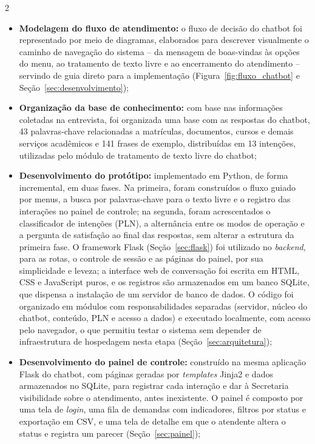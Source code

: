 \documentclass[10pt]{article}
\begin{document}
\begin{multicols}{2}
\begin{itemize}
  \item \textbf{Modelagem do fluxo de atendimento:} o fluxo de decisão do
  chatbot foi representado por meio de diagramas, elaborados para
  descrever visualmente o caminho de navegação do sistema -- da mensagem
  de boas-vindas às opções do menu, ao tratamento de texto livre e ao
  encerramento do atendimento -- servindo de guia direto para a implementação (Figura~\ref{fig:fluxo_chatbot} e Seção~\ref{sec:desenvolvimento});

  \item \textbf{Organização da base de conhecimento:} com base nas
  informações coletadas na entrevista, foi organizada uma base com as respostas do chatbot, 43 palavras-chave relacionadas a matrículas, documentos, cursos e demais serviços acadêmicos e 141 frases de exemplo, distribuídas em 13 intenções, utilizadas pelo módulo de tratamento de texto livre do chatbot;

  \item \textbf{Desenvolvimento do protótipo:} implementado em Python, de
forma incremental, em duas fases. Na primeira, foram construídos o fluxo
guiado por menus, a busca por palavras-chave para o texto livre e o
registro das interações no painel de controle; na segunda, foram
acrescentados o classificador de intenções (PLN), a alternância entre os
modos de operação e a pergunta de satisfação ao final das respostas, sem
alterar a estrutura da primeira fase. O framework Flask
(Seção~\ref{sec:flask}) foi utilizado no \textit{backend}, para as rotas,
o controle de sessão e as páginas do painel, por sua simplicidade e
leveza; a interface web de conversação foi escrita em HTML, CSS e
JavaScript puros, e os registros são armazenados em um banco SQLite, que
dispensa a instalação de um servidor de banco de dados. O código foi
organizado em módulos com responsabilidades separadas (servidor, núcleo do
chatbot, conteúdo, PLN e acesso a dados) e executado localmente, com
acesso pelo navegador, o que permitiu testar o sistema sem depender de
infraestrutura de hospedagem nesta etapa (Seção~\ref{sec:arquitetura});
  \item \textbf{Desenvolvimento do painel de controle:} construído na mesma aplicação Flask do chatbot, com páginas geradas por \textit{templates} Jinja2 e dados armazenados no SQLite, para registrar cada interação e dar à Secretaria visibilidade sobre o atendimento, antes inexistente. O painel é composto por uma tela de \textit{login}, uma fila de demandas com indicadores, filtros por status e exportação em CSV, e uma tela de detalhe em que o atendente altera o status e registra um parecer (Seção~\ref{sec:painel});


\end{itemize}
\end{multicols}
\end{document}
